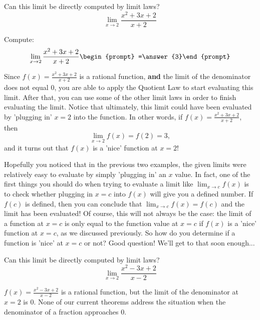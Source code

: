 \documentclass{ximera}
\begin{document}
\begin{question}
  Can this limit be directly computed by limit laws?
  \[
  \displaystyle\lim_{x\to 2}\frac{x^2+3x+2}{x+2} 
  \]
  \begin{multipleChoice}
  \end{multipleChoice}
  \begin{question}
    Compute:
    \[
    \displaystyle\lim_{x\to 2}\frac{x^2+3x+2}{x+2}\begin{prompt} =\answer{3}\end{prompt}
    \]
    \begin{feedback}
      Since $f(x)=\frac{x^2+3x+2}{x+2}$ is a rational function, \textbf{and}
      the limit of the denominator does not equal $0$, you are able to apply the Quotient Law to start evaluating this limit.  After that, you can use some of the other limit laws in order to finish evaluating the limit.  Notice that ultimately, this limit could have been evaluated by 'plugging in' $x=2$ into the function.  In other words, if $f(x) = \frac{x^2+3x+2}{x+2}$, then $$\displaystyle\lim_{x\to 2} f(x) = f(2) = 3,$$ and it turns out that $f(x)$ is a 'nice' function at $x=2$!  
    \end{feedback}
  \end{question}
\end{question}

\begin{explanation}
Hopefully you noticed that in the previous two examples, the given limits were relatively easy to evaluate by simply 'plugging in' an $x$ value.  In fact, one of the first things you should do when trying to evaluate a limit like $\displaystyle\lim_{x \to c} f(x)$ is to check whether plugging in $x=c$ into $f(x)$ will give you a defined number.  If $f(c)$ is defined, then you can conclude that $\displaystyle\lim_{x \to c} f(x) = f(c)$ and the limit has been evaluated!  Of course, this will not always be the case: the limit of a function at $x=c$ is only equal to the function value at $x=c$ if $f(x)$ is a 'nice' function at $x=c$, as we discussed previously.  So how do you determine if a function is 'nice' at $x=c$ or not?  Good question!  We'll get to that soon enough...

\end{explanation}

\begin{question}
  Can this limit be directly computed by limit laws?
  \[
  \displaystyle\lim_{x\to 2}\frac{x^2-3x+2}{x-2}
  \]
  \begin{multipleChoice}
  \end{multipleChoice}
  \begin{feedback}
    $f(x) = \frac{x^2-3x+2}{x-2}$ is a rational function, but the limit of the denominator at $x=2$ is $0$. None of our current
    theorems address the situation when the denominator of a fraction
    approaches $0$.  
  \end{feedback}
\end{question}
\end{document}
